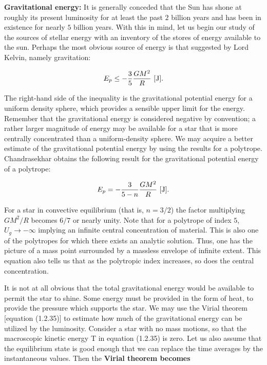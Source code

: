 \documentclass[a4paper,10pt]{article}
\begin{document}
{\noindent}\textbf{Gravitational energy:} It is generally conceded that the Sun has shone at roughly its present luminosity for at least the past $2$ billion years and has been in existence for nearly $5$ billion years. With this in mind, let us begin our study of the sources of stellar energy with an inventory of the stores of energy available to the sun. Perhaps the most obvious source of energy is that suggested by Lord Kelvin, namely gravitation:

\begin{align*}
    E_p \leq -\frac{3}{5}\frac{GM^2}{R} ~ [{\rm J}].
\end{align*}

{\noindent}The right-hand side of the inequality is the gravitational potential energy for a uniform density sphere, which provides a sensible upper limit for the energy. Remember that the gravitational energy is considered negative by convention; a rather larger magnitude of energy may be available for a star that is more centrally concentrated than a uniform-density sphere. We may acquire a better estimate of the gravitational potential energy by using the results for a polytrope. Chandrasekhar obtains the following result for the gravitational potential energy of a polytrope:

\begin{align*}
    E_p = -\frac{3}{5-n}\frac{GM^2}{R} ~ [{\rm J}].
\end{align*}

{\noindent}For a star in convective equilibrium (that is, $n=3/2$) the factor multiplying $GM^2/R$ becomes $6/7$ or nearly unity. Note that for a polytrope of index $5$, $U_g\rightarrow-\infty$ implying an infinite central concentration of material. This is also one of the polytropes for which there exists an analytic solution. Thus, one has the picture of a mass point surrounded by a massless envelope of infinite extent. This equation also tells us that as the polytropic index increases, so does the central concentration.

{\noindent}It is not at all obvious that the total gravitational energy would be available to permit the star to shine. Some energy must be provided in the form of heat, to provide the pressure which supports the star. We may use the Virial theorem [equation (1.2.35)] to estimate how much of the gravitational energy can be utilized by the luminosity. Consider a star with no mass motions, so that the macroscopic kinetic energy T in equation (1.2.35) is zero. Let us also assume that the equilibrium state is good enough that we can replace the time averages by the instantaneous values. Then the \textbf{Virial theorem becomes}
\end{document}
